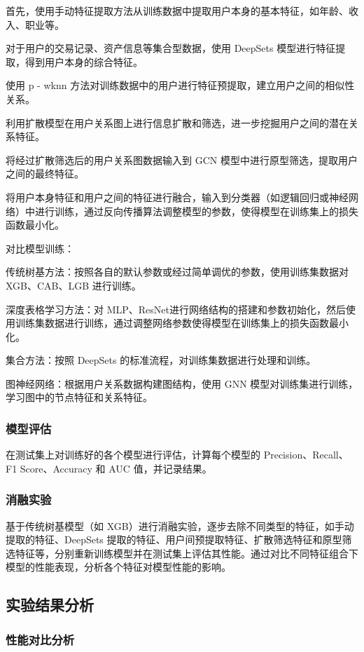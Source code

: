 \documentclass{article}
\begin{document}
首先，使用手动特征提取方法从训练数据中提取用户本身的基本特征，如年龄、收入、职业等。

对于用户的交易记录、资产信息等集合型数据，使用 DeepSets 模型进行特征提取，得到用户本身的综合特征。

使用 p - wknn 方法对训练数据中的用户进行特征预提取，建立用户之间的相似性关系。

利用扩散模型在用户关系图上进行信息扩散和筛选，进一步挖掘用户之间的潜在关系特征。

将经过扩散筛选后的用户关系图数据输入到 GCN 模型中进行原型筛选，提取用户之间的最终特征。

将用户本身特征和用户之间的特征进行融合，输入到分类器（如逻辑回归或神经网络）中进行训练，通过反向传播算法调整模型的参数，使得模型在训练集上的损失函数最小化。

对比模型训练：

传统树基方法：按照各自的默认参数或经过简单调优的参数，使用训练集数据对 XGB、CAB、LGB 进行训练。

深度表格学习方法：对 MLP、ResNet进行网络结构的搭建和参数初始化，然后使用训练集数据进行训练，通过调整网络参数使得模型在训练集上的损失函数最小化。

集合方法：按照 DeepSets 的标准流程，对训练集数据进行处理和训练。

图神经网络：根据用户关系数据构建图结构，使用 GNN 模型对训练集进行训练，学习图中的节点特征和关系特征。

\subsubsection{模型评估}

在测试集上对训练好的各个模型进行评估，计算每个模型的 Precision、Recall、F1 Score、Accuracy 和 AUC 值，并记录结果。

\subsubsection{消融实验}

基于传统树基模型（如 XGB）进行消融实验，逐步去除不同类型的特征，如手动提取的特征、DeepSets 提取的特征、用户间预提取特征、扩散筛选特征和原型筛选特征等，分别重新训练模型并在测试集上评估其性能。通过对比不同特征组合下模型的性能表现，分析各个特征对模型性能的影响。

\subsection{实验结果分析}

\subsubsection{性能对比分析}
\end{document}
